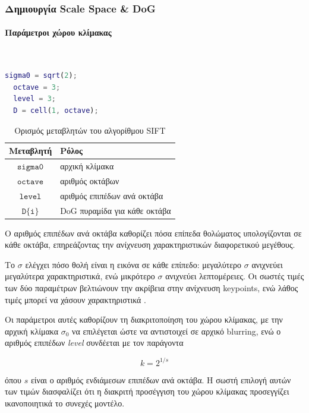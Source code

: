 \documentclass[12pt]{article}
\begin{document}
\subsubsection{Δημιουργία Scale Space \& DoG}
\paragraph{Παράμετροι χώρου κλίμακας}
\mbox{}\\
\begin{lstlisting}[language=Matlab]
  sigma0 = sqrt(2);
  octave = 3;
  level = 3;
  D = cell(1, octave);
\end{lstlisting}
\begin{table}[h]
  \centering
  \begin{tabular}{|c|l|}
  \hline
  \textbf{Μεταβλητή} & \textbf{Ρόλος} \\ \hline
  $\texttt{sigma0}$ & αρχική κλίμακα \\ \hline
  $\texttt{octave}$ & αριθμός οκτάβων \\ \hline
  $\texttt{level}$ & αριθμός επιπέδων ανά οκτάβα \\ \hline
  $\texttt{D\{i\}}$ & DoG πυραμίδα για κάθε οκτάβα \\ \hline
  \end{tabular}
  \caption{Ορισμός μεταβλητών του αλγορίθμου SIFT}
  \end{table}
Ο αριθμός επιπέδων ανά οκτάβα καθορίζει πόσα επίπεδα θολώματος υπολογίζονται σε κάθε οκτάβα, επηρεάζοντας την ανίχνευση χαρακτηριστικών διαφορετικού μεγέθους. 

  Το $\sigma$ ελέγχει πόσο θολή είναι η εικόνα σε κάθε επίπεδο: μεγαλύτερο $\sigma$ ανιχνεύει μεγαλύτερα χαρακτηριστικά, ενώ μικρότερο $\sigma$ ανιχνεύει λεπτομέρειες. Οι σωστές τιμές των δύο παραμέτρων βελτιώνουν την ακρίβεια στην ανίχνευση keypoints, ενώ λάθος τιμές μπορεί να χάσουν χαρακτηριστικά . 
  
  Οι παράμετροι αυτές καθορίζουν τη διακριτοποίηση του χώρου κλίμακας, με την αρχική κλίμακα $\sigma_0$ να επιλέγεται ώστε να αντιστοιχεί σε αρχικό blurring, ενώ ο αριθμός επιπέδων \textit{level} συνδέεται με τον παράγοντα
  
  \[
  k = 2^{1/s}
  \]
  
  όπου $s$ είναι ο αριθμός ενδιάμεσων επιπέδων ανά οκτάβα. Η σωστή επιλογή αυτών των τιμών διασφαλίζει ότι η διακριτή προσέγγιση του χώρου κλίμακας προσεγγίζει ικανοποιητικά το συνεχές μοντέλο.
   
\end{document}
